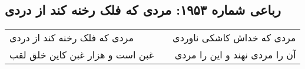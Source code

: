 \begin{center}
\section*{رباعی شماره ۱۹۵۳: مردی که فلک رخنه کند از دردی}
\label{sec:1953}
\begin{longtable}{l p{0.5cm} r}
مردی که فلک رخنه کند از دردی
&&
مردی که خداش کاشکی ناوردی
\\
غبن است و هزار غبن کاین خلق لقب
&&
آن را مردی نهند و این را مردی
\\
\end{longtable}
\end{center}

